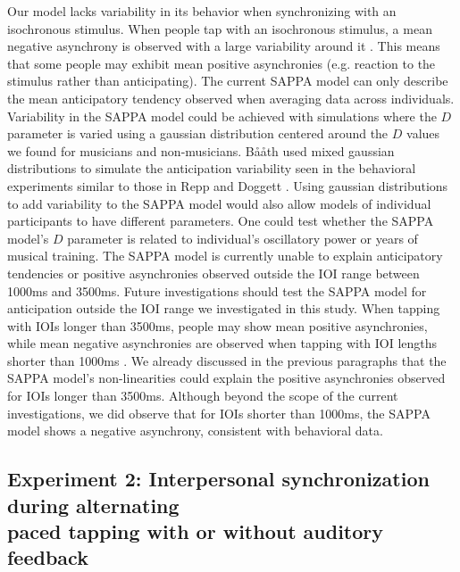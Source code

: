 \documentclass{report}
\begin{document}
Our model lacks variability in its behavior when synchronizing with an isochronous stimulus. When people tap with an isochronous stimulus, a mean negative asynchrony is observed with a large variability around it \cite{repp2005sensorimotor}. This means that some people may exhibit mean positive asynchronies (e.g. reaction to the stimulus rather than anticipating). The current SAPPA model can only describe the mean anticipatory tendency observed when averaging data across individuals. Variability in the SAPPA model could be achieved with simulations where the $D$ parameter is varied using a gaussian distribution centered around the $D$ values we found for musicians and non-musicians. B\aa\aa th \cite{baaaath2016estimating} used mixed gaussian distributions to simulate the anticipation variability seen in the behavioral experiments similar to those in Repp and Doggett \cite{repp2007tapping}. Using gaussian distributions to add variability to the SAPPA model would also allow models of individual participants to have different parameters. One could test whether the SAPPA model's $D$ parameter is related to individual's oscillatory power or years of musical training. The SAPPA model is currently unable to explain anticipatory tendencies or positive asynchronies observed outside the IOI range between 1000ms and 3500ms. Future investigations should test the SAPPA model for anticipation outside the IOI range we investigated in this study. When tapping with IOIs longer than 3500ms, people may show mean positive asynchronies, while mean negative asynchronies are observed when tapping with IOI lengths shorter than 1000ms \cite{miyake2004two}. We already discussed in the previous paragraphs that the SAPPA model's non-linearities could explain the positive asynchronies observed for IOIs longer than 3500ms. Although beyond the scope of the current investigations, we did observe that for IOIs shorter than 1000ms, the SAPPA model shows a negative asynchrony, consistent with behavioral data.

\subsection{Experiment 2: Interpersonal synchronization during alternating \\ paced tapping with or without auditory feedback}
\end{document}
